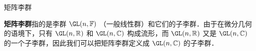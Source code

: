 
\begin{issues}
\issueDraft
\end{issues}


\begin{definition}{矩阵李群}

\textbf{矩阵李群}指的是李群 $\GL(n, \mathbb{F})$ （一般线性群）和它们的子李群．由于在微分几何的语境下，只有 $\GL(n, \mathbb{R})$ 和 $\GL(n, \mathbb{C})$ 构成流形，而 $\GL(n, \mathbb{R})$ 又是 $\GL(n, \mathbb{C})$ 的一个子李群，因此我们可以把矩阵李群定义成 $\GL(n, \mathbb{C})$ 的子李群．

\end{definition}
